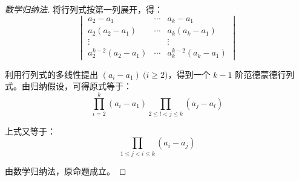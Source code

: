 \begin{proof}[数学归纳法]
	将行列式按第一列展开，得：
	$$
	\begin{vmatrix}
		a_2 - a_1 & \cdots & a_k - a_1
		\\
		a_2 (a_2 - a_1) & \cdots & a_k (a_k - a_1)
		\\
		\vdots & & \vdots
		\\
		a_2^{k - 2} (a_2 - a_1) & \cdots & a_k^{k - 2} (a_k - a_1)
	\end{vmatrix}
	$$

	利用行列式的多线性提出 $(a_i - a_1) \pod{i \ge 2}$，得到一个 $k - 1$ 阶范德蒙德行列式。由归纳假设，可得原式等于：
	$$
	\prod\limits_{i = 2}^k (a_i - a_1) \prod_{2 \le l < j \le k} (a_j - a_l)
	$$

	上式又等于：
	$$
	\prod\limits_{1 \le j < i \le k} (a_i - a_j)
	$$

	由数学归纳法，原命题成立。
\end{proof}